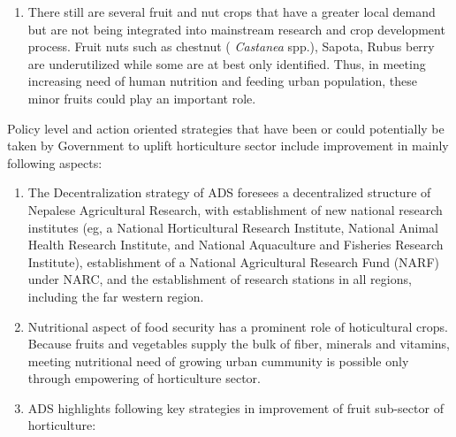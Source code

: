 \documentclass[
]{book}
\begin{document}
\begin{enumerate}
\item
  There still are several fruit and nut crops that have a greater local demand but are not being integrated into mainstream research and crop development process. Fruit nuts such as chestnut ( \emph{Castanea} spp.), Sapota, Rubus berry are underutilized while some are at best only identified. Thus, in meeting increasing need of human nutrition and feeding urban population, these minor fruits could play an important role.
\end{enumerate}

Policy level and action oriented strategies that have been or could potentially be taken by Government to uplift horticulture sector include improvement in mainly following aspects:

\begin{enumerate}
\def\labelenumi{\arabic{enumi}.}
\item
  The Decentralization strategy of ADS foresees a decentralized structure of Nepalese Agricultural Research, with establishment of new national research institutes (eg, a National Horticultural Research Institute, National Animal Health Research Institute, and National Aquaculture and Fisheries Research Institute), establishment of a National Agricultural Research Fund (NARF) under NARC, and the establishment of research stations in all regions, including the far western region.
\item
  Nutritional aspect of food security has a prominent role of hoticultural crops. Because fruits and vegetables supply the bulk of fiber, minerals and vitamins, meeting nutritional need of growing urban cummunity is possible only through empowering of horticulture sector.
\item
  ADS highlights following key strategies in improvement of fruit sub-sector of horticulture:
\end{enumerate}
\end{document}
